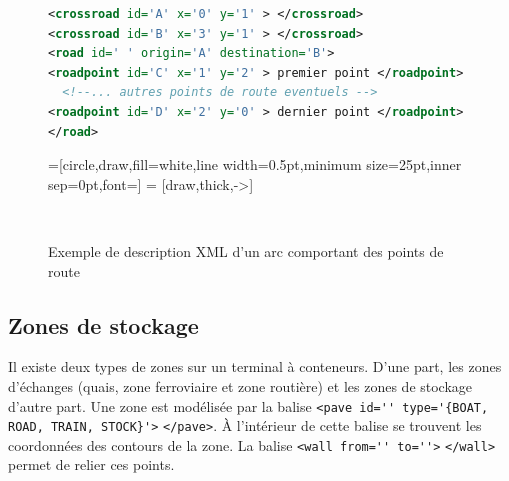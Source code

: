 \begin{figure}[h]
 
\begin{lstlisting}[language=XML]
<crossroad id='A' x='0' y='1' > </crossroad>
<crossroad id='B' x='3' y='1' > </crossroad>
<road id=' ' origin='A' destination='B'>
<roadpoint id='C' x='1' y='2' > premier point </roadpoint>
  <!--... autres points de route eventuels -->
<roadpoint id='D' x='2' y='0' > dernier point </roadpoint>
</road>
\end{lstlisting}

{
\centering
{}=[circle,draw,fill=white,line width=0.5pt,minimum size=25pt,inner sep=0pt,font=\tiny]
 = [draw,thick,->]
 \\
}
\caption{Exemple de description XML d'un arc comportant des points de route}
\label{fig:simulation:ptsRoute}
\end{figure}

\subsection{Zones de stockage}\label{sec:description:zonesStockage}

Il existe deux types de zones sur un terminal à conteneurs. D'une part, les zones d'échanges (quais, zone ferroviaire et zone routière) et les zones de stockage d'autre part. Une zone est modélisée par la balise \verb!<pave id='' type='{BOAT, ROAD, TRAIN, STOCK}'>! \verb!</pave>!. À l'intérieur de cette balise se trouvent les coordonnées des contours de la zone. La balise \verb!<wall from='' to=''>! \verb!</wall>! permet de relier ces points.

